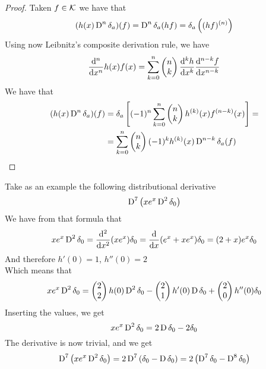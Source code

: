 \documentclass[../complete.tex]{subfiles}
\begin{document}
\begin{proof}
	Taken $f\in\mathcal{K}$ we have that
	\begin{equation*}
		(h(x)\operatorname{\mathrm{D}}^{n}\delta_a)(f)=\operatorname{\mathrm{D}}^n\delta_a(hf)=\delta_a\left( (hf)^{(n)} \right)
	\end{equation*}
	Using now Leibnitz's composite derivation rule, we have
	\begin{equation*}
		\derivative[n]{x}h(x)f(x)=\sum_{k=0}^{n}\begin{pmatrix}n\\k\end{pmatrix}\derivative[k]{h}{x}\derivative[n-k]{f}{x}
	\end{equation*}
	We have that
	\begin{equation*}
		\begin{aligned}
			(h(x)\operatorname{\mathrm{D}}^n\delta_a)(f)&=\delta_a\left[ (-1)^n\sum_{k=0}^{n}\begin{pmatrix}n\\k\end{pmatrix}h^{(k)}(x)f^{(n-k)}(x) \right]=\\
			&=\sum_{k=0}^n\begin{pmatrix}n\\k\end{pmatrix}(-1)^kh^{(k)}(x)\operatorname{\mathrm{D}}^{n-k}\delta_a(f)
		\end{aligned}
	\end{equation*}
\end{proof}
\begin{eg}
	Take as an example the following distributional derivative
	\begin{equation*}
		\operatorname{\mathrm{D}}^7\left( xe^x\operatorname{\mathrm{D}}^2\delta_0 \right)
	\end{equation*}
	We have from that formula that
	\begin{equation*}
		xe^x\D^2\delta_0=\derivative[2]{x}(xe^x)\delta_0=\derivative{x}(e^x+xe^x)\delta_0=(2+x)e^x\delta_0
	\end{equation*}
	And therefore $h'(0)=1$, $h''(0)=2$\\
	Which means that
	\begin{equation*}
		xe^x\operatorname{\mathrm{D}}^2\delta_0=\begin{pmatrix}2\\2\end{pmatrix}h(0)\operatorname{\mathrm{D}}^2\delta_0-\begin{pmatrix}2\\1\end{pmatrix}h'(0)\operatorname{\mathrm{D}}\delta_0+\begin{pmatrix}2\\0\end{pmatrix}h''(0)\delta_0
	\end{equation*}
	Inserting the values, we get
	\begin{equation*}
		xe^x\operatorname{\mathrm{D}}^2\delta_0=2\operatorname{\mathrm{D}}\delta_0-2\delta_0
	\end{equation*}
	The derivative is now trivial, and we get
	\begin{equation*}
		\operatorname{\mathrm{D}}^7\left( xe^x\operatorname{\mathrm{D}}^2\delta_0 \right)=2\operatorname{\mathrm{D}}^7\left( \delta_0-\operatorname{\mathrm{D}}\delta_0 \right)=2\left( \operatorname{\mathrm{D}}^7\delta_0-\operatorname{\mathrm{D}}^8\delta_0 \right)
	\end{equation*}
\end{eg}
\end{document}
